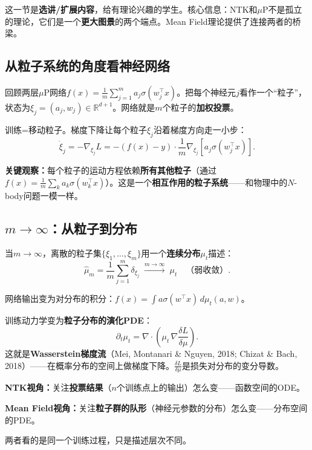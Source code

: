 \documentclass[11pt,a4paper]{article}
\newcommand{\R}{\mathbb{R}}
\begin{document}
\begin{teachingtip}
这一节是\textbf{选讲/扩展内容}，给有理论兴趣的学生。核心信息：NTK和$\mu$P不是孤立的理论，它们是一个\textbf{更大图景}的两个端点。Mean Field理论提供了连接两者的桥梁。
\end{teachingtip}

\subsection{从粒子系统的角度看神经网络}

回顾两层$\mu$P网络$f(x)=\frac{1}{m}\sum_{j=1}^m a_j\sigma(w_j^\top x)$。把每个神经元$j$看作一个``粒子''，状态为$\xi_j=(a_j, w_j)\in\R^{d+1}$。网络就是$m$个粒子的\textbf{加权投票}。

训练=移动粒子。梯度下降让每个粒子$\xi_j$沿着梯度方向走一小步：
\[
\dot\xi_j = -\nabla_{\xi_j}L = -(f(x)-y)\cdot\frac{1}{m}\nabla_{\xi_j}[a_j\sigma(w_j^\top x)].
\]

\textbf{关键观察：}每个粒子的运动方程依赖\textbf{所有其他粒子}（通过$f(x)=\frac{1}{m}\sum_k a_k\sigma(w_k^\top x)$）。这是一个\textbf{相互作用的粒子系统}——和物理中的$N$-body问题一模一样。

\subsection{$m\to\infty$：从粒子到分布}

当$m\to\infty$，离散的粒子集$\{\xi_1,\dots,\xi_m\}$用一个\textbf{连续分布}$\mu_t$描述：
\[
\hat\mu_m = \frac{1}{m}\sum_{j=1}^m \delta_{\xi_j} \;\xrightarrow{m\to\infty}\; \mu_t \quad\text{（弱收敛）}.
\]

网络输出变为对分布的积分：$f(x)=\int a\sigma(w^\top x)\,d\mu_t(a,w)$。

训练动力学变为\textbf{粒子分布的演化PDE}：
\[
\boxed{\partial_t\mu_t = \nabla\cdot\!\left(\mu_t\,\nabla\frac{\delta L}{\delta\mu}\right).}
\]
这就是\textbf{Wasserstein梯度流}（Mei, Montanari \& Nguyen, 2018; Chizat \& Bach, 2018）——在概率分布的空间上做梯度下降。$\frac{\delta L}{\delta\mu}$是损失对分布的变分导数。

\begin{keyinsight}
\textbf{NTK视角：}关注\textbf{投票结果}（$n$个训练点上的输出）怎么变——函数空间的ODE。

\textbf{Mean Field视角：}关注\textbf{粒子群的队形}（神经元参数的分布）怎么变——分布空间的PDE。

两者看的是同一个训练过程，只是描述层次不同。
\end{keyinsight}
\end{document}
